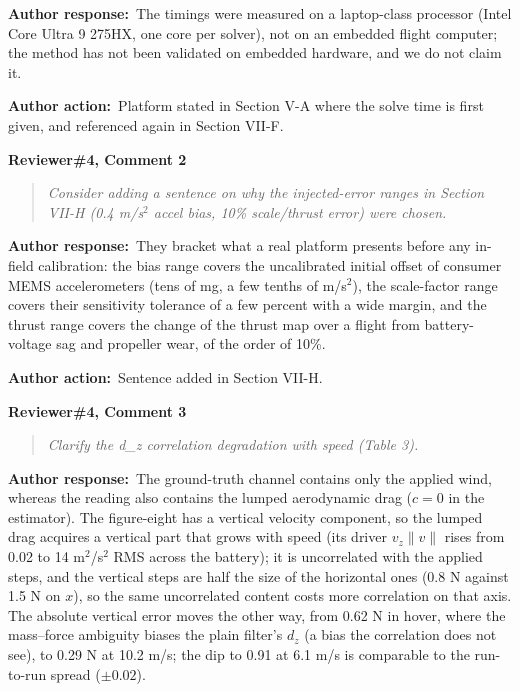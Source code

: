 \documentclass[11pt]{article}
\newcommand{\concern}[1]{\par\medskip\noindent\colorbox{gray!12}{\parbox{\dimexpr\linewidth-2\fboxsep}{\textbf{#1}}}\par\smallskip}
\newcommand{\rlabel}[1]{\par\textbf{#1}\ }
\begin{document}
\rlabel{Author response:}The timings were measured on a laptop-class processor (Intel Core Ultra 9 275HX, one core per solver), not on an embedded flight computer; the method has not been validated on embedded hardware, and we do not claim it.

\rlabel{Author action:}Platform stated in Section V-A where the solve time is first given, and referenced again in Section VII-F.

\concern{Reviewer\#4, Comment 2}

\begin{quote}\itshape Consider adding a sentence on why the injected-error ranges in Section VII-H (0.4 m/s$^2$ accel bias, 10\% scale/thrust error) were chosen.\end{quote}

\rlabel{Author response:}They bracket what a real platform presents before any in-field calibration: the bias range covers the uncalibrated initial offset of consumer MEMS accelerometers (tens of mg, a few tenths of m/s$^2$), the scale-factor range covers their sensitivity tolerance of a few percent with a wide margin, and the thrust range covers the change of the thrust map over a flight from battery-voltage sag and propeller wear, of the order of 10\%.

\rlabel{Author action:}Sentence added in Section VII-H.

\concern{Reviewer\#4, Comment 3}

\begin{quote}\itshape Clarify the d\_z correlation degradation with speed (Table 3).\end{quote}

\rlabel{Author response:}The ground-truth channel contains only the applied wind, whereas the reading also contains the lumped aerodynamic drag ($c = 0$ in the estimator). The figure-eight has a vertical velocity component, so the lumped drag acquires a vertical part that grows with speed (its driver $v_z\|v\|$ rises from 0.02 to 14 m$^2$/s$^2$ RMS across the battery); it is uncorrelated with the applied steps, and the vertical steps are half the size of the horizontal ones (0.8 N against 1.5 N on $x$), so the same uncorrelated content costs more correlation on that axis. The absolute vertical error moves the other way, from 0.62 N in hover, where the mass--force ambiguity biases the plain filter's $d_z$ (a bias the correlation does not see), to 0.29 N at 10.2 m/s; the dip to 0.91 at 6.1 m/s is comparable to the run-to-run spread ($\pm 0.02$).
\end{document}
